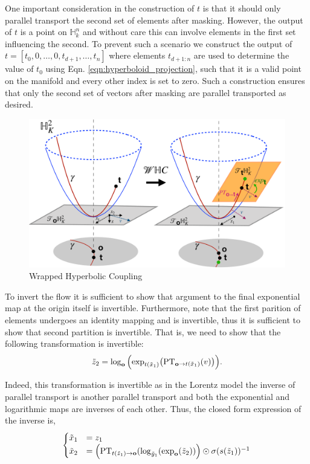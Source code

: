 One important consideration in the construction of $t$ is that it should only parallel transport the second set of elements after masking. However, the output of $t$ is a point on $\mathbb{H}^n_k$ and without care this can involve elements in the first set influencing the second. To prevent such a scenario we construct the output of $t = [t_0, 0, \dots , 0, t_{d+1}, \dots , t_{n}]$ where elements $t_{d+1:n}$ are used to determine the value of $t_0$ using Eqn. \ref{eqn:hyperboloid_projection}, such that it is a valid point on the manifold and every other index is set to zero. Such a construction ensures that only the second set of vectors after masking are parallel transported as desired. 
\begin{figure}
    \centering
    \includegraphics[width=\linewidth]{hyperbolic_flows_arch.pdf}
    \vspace{-5mm}
    \caption{Wrapped Hyperbolic Coupling}
    \vspace{-10pt}
    \label{fig:whc_architecture_diagram}
\end{figure}

To invert the flow it is sufficient to show that argument to the final exponential map at the origin itself is invertible. Furthermore, note that the first parition of elements undergoes an identity mapping and is invertible, thus it is sufficient to show that second partition is invertible. That is, we need to show that the following transformation is invertible:
\begin{equation}
     \tilde{z}_{2} = \log_{\textbf{o}}\Big( \textnormal{exp}_{t(\tilde{x}_{1})}\big(\textnormal{PT}_{\textbf{o}\to t(\tilde{x}_{1}) }(v)\big)\Big).
\end{equation}

Indeed, this transformation is invertible as in the Lorentz model the inverse of parallel transport is another parallel transport and both the exponential and logarithmic maps are inverses of each other. Thus, the closed form expression of the inverse is,
\begin{align}
     \begin{cases}
     \tilde{x}_{1} &= z_{1} \\
     \tilde{x}_{2} &= \Big( \textnormal{PT}_{t(\tilde{z}_{1}) \to \textbf{o} }(\log_{\tilde{y}_{1}}( \textnormal{exp}_{\textbf{o}}(\tilde{z}_{2}))\Big) \odot \sigma(s(\tilde{z}_{1}))^{-1} \\
    \end{cases}
\end{align}

